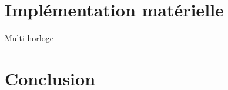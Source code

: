 \documentclass[12pt,a4paper]{article}
\begin{document}
\section{Implémentation matérielle}





\label{SmartClock}
Multi-horloge

\section{Conclusion}
\end{document}
